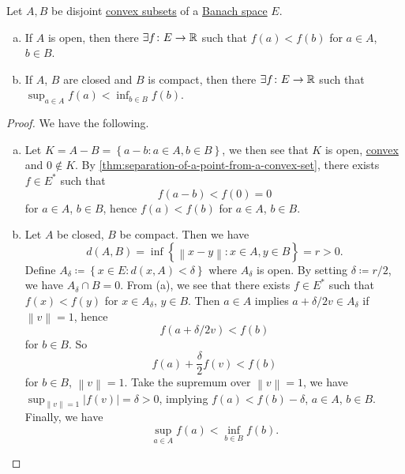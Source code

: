 \begin{theorem}\label{thm:separation-of-convex-sets}
	Let \(A, B\) be disjoint \hyperref[def:convex-set]{convex subsets} of a \hyperref[def:Banach-space]{Banach space} \(E\).
	\begin{enumerate}[(a)]
		\item If \(A\) is open, then there \(\exists f\colon E\to \mathbb{\MakeUppercase{r}} \) such that \(f(a) < f(b)\) for \(a\in A\), \(b\in B\).
		\item If \(A\), \(B\) are closed and \(B\) is compact, then there \(\exists f\colon E\to \mathbb{\MakeUppercase{r}} \) such that \(\sup _{a\in A} f(a) < \inf _{b\in B}f(b)\).
	\end{enumerate}
\end{theorem}
\begin{proof}
	We have the following.
	\begin{enumerate}[(a)]
		\item Let \(K = A - B = \left\{ a - b\colon a\in A, b\in B \right\} \), we then see that \(K\) is open, \hyperref[def:convex-set]{convex} and \(0 \notin K\). By \autoref{thm:separation-of-a-point-from-a-convex-set}, there exists \(f\in E^{\ast} \) such that
		      \[
			      f(a - b) < f(0) = 0
		      \]
		      for \(a\in A\), \(b\in B\), hence \(f(a) < f(b)\) for \(a\in A\), \(b\in B\).
		\item Let \(A\) be closed, \(B\) be compact. Then we have
		      \[
			      d(A, B) = \inf \left\{ \left\lVert x-y\right\rVert \colon x\in A, y\in B \right\} = r > 0.
		      \]
		      Define \(A_\delta \coloneqq \left\{ x\in E\colon d(x, A) < \delta  \right\} \) where \(A_\delta \) is open. By setting \(\delta \coloneqq r / 2\), we have \(A_\delta \cap B = 0\). From (a), we see that there exists \(f\in E^{\ast} \) such that \(f(x) < f(y)\) for \(x\in A_\delta \), \(y\in B\). Then \(a\in A\) implies \(a + \delta /2 v \in A_\delta \) if \(\left\lVert v\right\rVert = 1\), hence
		      \[
			      f(a + \delta / 2 v)< f(b)
		      \]
		      for \(b\in B\). So
		      \[
			      f(a) + \frac{\delta }{2}f(v) < f(b)
		      \]
		      for \(b\in B\), \(\left\lVert v\right\rVert = 1\). Take the supremum over \(\left\lVert v\right\rVert = 1\), we have \(\sup _{\left\lVert v\right\rVert = 1} \left\vert f(v) \right\vert = \delta > 0\), implying \(f(a) < f(b) - \delta \), \(a\in A\), \(b\in B\). Finally, we have
		      \[
			      \sup _{a\in A}f(a) < \inf _{b\in B}f(b).
		      \]
	\end{enumerate}
\end{proof}